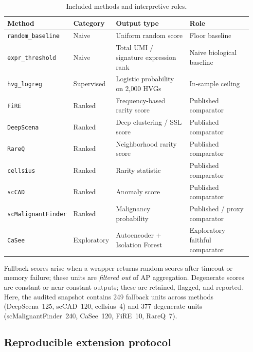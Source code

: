 \documentclass[10pt]{article}
\begin{document}
\begin{table}[H]
\centering
\caption{Included methods and interpretive roles.}
\label{tab:methods}
\small
\begin{tabular}{llll}
\toprule
Method & Category & Output type & Role \\
\midrule
\texttt{random\_baseline}  & Naive       & Uniform random score                  & Floor baseline \\
\texttt{expr\_threshold}   & Naive       & Total UMI / signature expression rank & Naive biological baseline \\
\texttt{hvg\_logreg}       & Supervised  & Logistic probability on 2{,}000 HVGs   & In-sample ceiling \\
\texttt{FiRE}              & Ranked      & Frequency-based rarity score          & Published comparator \\
\texttt{DeepScena}         & Ranked      & Deep clustering / SSL score           & Published comparator \\
\texttt{RareQ}             & Ranked      & Neighborhood rarity score            & Published comparator \\
\texttt{cellsius}          & Ranked      & Rarity statistic                      & Published comparator \\
\texttt{scCAD}             & Ranked      & Anomaly score                         & Published comparator \\
\texttt{scMalignantFinder} & Ranked      & Malignancy probability                & Published / proxy comparator \\
\texttt{CaSee}             & Exploratory & Autoencoder $+$ Isolation Forest      & Exploratory faithful comparator \\
\bottomrule
\end{tabular}
\end{table}

Fallback scores arise when a wrapper
returns random scores after timeout or memory failure; these units are
\emph{filtered out} of AP aggregation. Degenerate scores are constant or near constant outputs; these are retained, flagged, and reported.
Here, the audited snapshot contains 249 fallback units across
methods (DeepScena~125, scCAD~120, cellsius~4) and 377 degenerate units
(scMalignantFinder~240, CaSee~120, FiRE~10, RareQ~7).

\subsection{Reproducible extension protocol}
\end{document}
